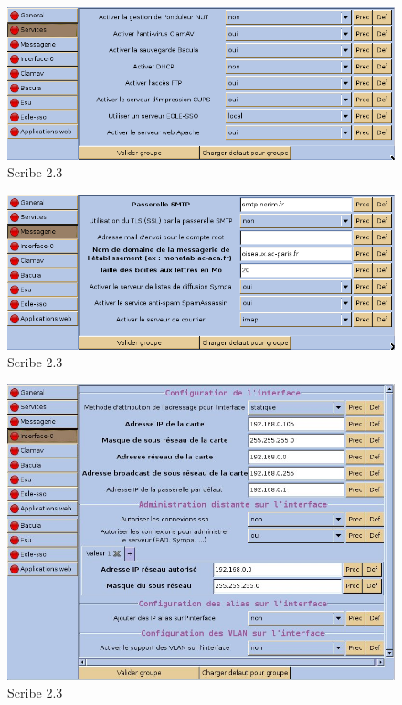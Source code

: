 \documentclass{article}
\makeatletter
\def\maxwidth{\ifdim\Gin@nat@width>\linewidth\linewidth
\else\Gin@nat@width\fi}
\let\Oldincludegraphics\includegraphics
\renewcommand{\includegraphics}[1]{\Oldincludegraphics[width=\maxwidth]{#1}}
\makeatother
\begin{document}
\begin{figure}[htbp]
\centering
\includegraphics{scribe_html_m291b378c.png}
\caption{Scribe 2.3}
\end{figure}

\begin{figure}[htbp]
\centering
\includegraphics{scribe_html_m408bb4bb.png}
\caption{Scribe 2.3}
\end{figure}

\begin{figure}[htbp]
\centering
\includegraphics{scribe_html_43381116.jpg}
\caption{Scribe 2.3}
\end{figure}
\end{document}
